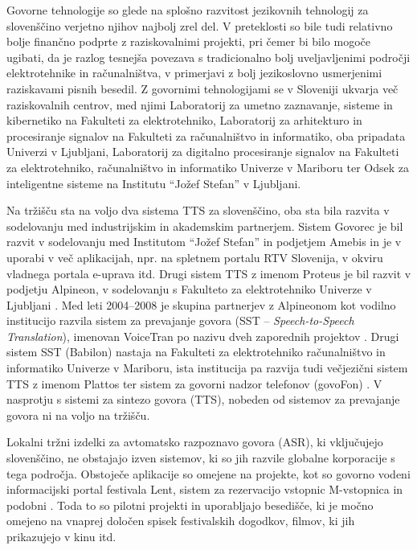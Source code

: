 \begin{multicols}{2}
Go\-vorne tehnologije so glede na splošno razvitost jezikovnih tehnologij za slovenščino verjetno njihov naj\-bolj zrel del. V preteklosti so bile tudi relativno bolje finančno podprte z raziskovalnimi projekti, pri čemer bi bilo mogoče ugibati, da je razlog tesnej\-ša povezava s tradicionalno bolj uveljav\-ljenimi področji elektrotehnike in računalništva, v primerjavi z bolj jezikoslovno usmerjenimi raziskavami pisnih besedil. Z go\-vornimi tehnologijami se v Sloveniji ukvarja več raziskovalnih centrov, med njimi Labo\-ratorij za umetno zaznavanje, sisteme in kibernetiko na Fakulteti za elektrotehniko, Labo\-ratorij za arhitekturo in procesiranje signalov na Fakulteti za računalništvo in informatiko, oba pripadata Univerzi v Ljub\-ljani, Laboratorij za digitalno procesiranje signalov na Fakulteti za elektrotehniko, računalništvo in informatiko Univerze v Mariboru ter Odsek za inteligentne sisteme na Institutu “Jožef Stefan” v Ljub\-ljani.

Na tržišču sta na voljo dva sistema TTS za slovenščino, oba sta bila razvita v sodelovanju med industrijskim in akademskim partnerjem. Sistem Govorec je bil razvit v sodelovanju med Institutom “Jožef Stefan” in podjetjem Amebis in je v uporabi v več aplikacijah, npr. na spletnem portalu RTV Slovenija, v okviru vladnega portala e-uprava itd. \cite{Amb3}  Drugi sistem TTS z imenom Proteus je bil razvit v podjetju Alpineon, v sodelovanju s Fakulteto za elektrotehniko Univerze v Ljub\-ljani \cite{Alp1}. Med leti 2004--2008 je skupina partnerjev z Alpineonom kot vodilno institucijo razvila sistem za prevajanje go\-vora (SST – \textit{Speech-to-Speech Translation}), imenovan VoiceTran po nazivu dveh zaporednih projektov \cite{Alp2}.  Drugi sistem SST (Babilon) nastaja na Fakulteti za elektrotehniko računalništvo in informatiko Univerze v Mariboru, ista institucija pa razvija tudi večjezični sistem TTS z imenom Plattos ter sistem za go\-vorni nadzor telefonov (govoFon) \cite{Lab1}.  V nasprotju s sistemi za sintezo go\-vora (TTS), nobeden od sistemov za prevajanje go\-vora ni na voljo na tržišču.

Lokalni tržni izdelki za avtomatsko razpoznavo go\-vora (ASR), ki vključujejo slovenščino, ne obstajajo izven sistemov, ki so jih razvile globalne kor\-poracije s tega področja. Obstoječe aplikacije so omejene na projekte, kot so go\-vorno vodeni informacij\-ski portal festivala Lent, \cite{Lent1} sistem za rezervacijo vstopnic M-vstopnica  in podobni \cite{Kolosej1}. Toda to so pilotni projekti in uporab\-ljajo besedišče, ki je močno omejeno na vnaprej določen spisek festivalskih dogodkov, filmov, ki jih prikazujejo v kinu itd.


\end{multicols}
